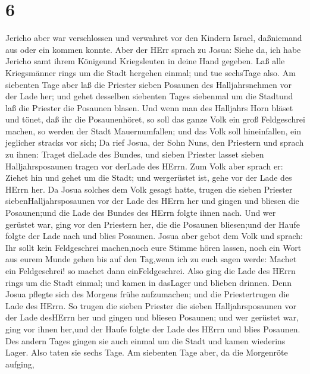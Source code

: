 \hypertarget{section-5}{%
\section{6}\label{section-5}}

 Jericho aber war verschlossen und verwahret vor den Kindern
Israel, daßniemand aus oder ein kommen konnte.  Aber der
HErr sprach zu Josua: Siehe da, ich habe Jericho samt ihrem Königeund
Kriegsleuten in deine Hand gegeben.  Laß alle Kriegsmänner
rings um die Stadt hergehen einmal; und tue sechsTage also. 
Am siebenten Tage aber laß die Priester sieben Posaunen des
Halljahrsnehmen vor der Lade her; und gehet desselben siebenten Tages
siebenmal um die Stadtund laß die Priester die Posaunen blasen.
 Und wenn man des Halljahrs Horn bläset und tönet, daß ihr
die Posaunenhöret, so soll das ganze Volk ein groß Feldgeschrei machen,
so werden der Stadt Mauernumfallen; und das Volk soll hineinfallen, ein
jeglicher stracks vor sich;  Da rief Josua, der Sohn Nuns,
den Priestern und sprach zu ihnen: Traget dieLade des Bundes, und sieben
Priester lasset sieben Halljahrsposaunen tragen vor derLade des HErrn.
 Zum Volk aber sprach er: Ziehet hin und gehet um die Stadt;
und wergerüstet ist, gehe vor der Lade des HErrn her.  Da
Josua solches dem Volk gesagt hatte, trugen die sieben Priester
siebenHalljahrsposaunen vor der Lade des HErrn her und gingen und
bliesen die Posaunen;und die Lade des Bundes des HErrn folgte ihnen
nach.  Und wer gerüstet war, ging vor den Priestern her, die
die Posaunen bliesen;und der Haufe folgte der Lade nach und blies
Posaunen.  Josua aber gebot dem Volk und sprach: Ihr sollt
kein Feldgeschrei machen,noch eure Stimme hören lassen, noch ein Wort
aus eurem Munde gehen bis auf den Tag,wenn ich zu euch sagen werde:
Machet ein Feldgeschrei! so machet dann einFeldgeschrei. 
Also ging die Lade des HErrn rings um die Stadt einmal; und kamen in
dasLager und blieben drinnen.  Denn Josua pflegte sich des
Morgens frühe aufzumachen; und die Priestertrugen die Lade des HErrn.
 So trugen die sieben Priester die sieben Halljahrsposaunen
vor der Lade desHErrn her und gingen und bliesen Posaunen; und wer
gerüstet war, ging vor ihnen her,und der Haufe folgte der Lade des HErrn
und blies Posaunen.  Des andern Tages gingen sie auch
einmal um die Stadt und kamen wiederins Lager. Also taten sie sechs
Tage.  Am siebenten Tage aber, da die Morgenröte aufging,
